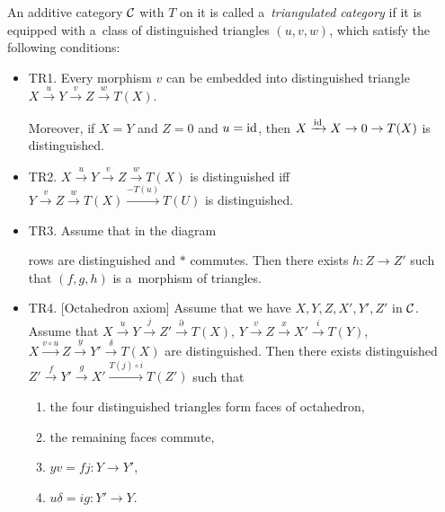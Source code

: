 	\begin{definition}
		An additive category $\mathcal{C}$ with $T$ on it is called
		a~{\em triangulated category} if it is equipped
		with a~class of distinguished triangles $(u,v,w)$,
		which satisfy the following conditions:
		\begin{itemize}
			\item TR1. Every morphism $v$ can be embedded into 
			distinguished triangle 
			\\$X \xrightarrow u Y \xrightarrow v Z \xrightarrow w T(X)$.
			
			Moreover, if $X=Y$ and $Z=0$ and $u={\mathrm{id}}$, then
			$X \xrightarrow{{\mathrm{id}}} X \to 0 \to T(X)$
			is distinguished.
			
			\item TR2. $X \xrightarrow u Y \xrightarrow v Z \xrightarrow w T(X)$
			is distinguished iff
			$Y \xrightarrow v Z \xrightarrow w T(X) \xrightarrow{-T(u)} T(U)$
			is distinguished.
			
			\item TR3. Assume that in the diagram
			
			
			rows are distinguished and $\ast$ commutes.
			Then there exists $h:Z \to Z'$ such that $(f,g,h)$
			is a~morphism of triangles.
			
			\item TR4. [Octahedron axiom]
			Assume that we have $X,Y,Z,X',Y',Z'$ in $\mathcal{C}$.
			Assume that 
			$X \xrightarrow u Y \xrightarrow j Z' \xrightarrow \partial T(X)$,
			$Y \xrightarrow v Z \xrightarrow x X' \xrightarrow i T(Y)$,
			$X \xrightarrow {v \circ u} Z \xrightarrow y Y' \xrightarrow \delta T(X)$
			are distinguished.
			Then there exists distinguished
			$Z' \xrightarrow f Y' \xrightarrow g X' \xrightarrow {T(j) \circ i} T(Z')$
			such that
			\begin{enumerate}
				\item the four distinguished triangles form faces of octahedron,
				\item the remaining faces commute,
				\item $yv = fj: Y \to Y'$,
				\item $u \delta = i g: Y' \to Y$.
			\end{enumerate}
			

\end{itemize}
\end{definition}
